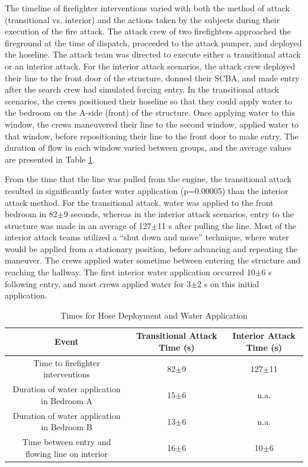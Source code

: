 \documentclass[12pt,oneside]{article}
\begin{document}
The timeline of firefighter interventions varied with both the method of attack (transitional vs. interior) and the actions taken by the subjects during their execution of the fire attack. The attack crew of two firefighters approached the fireground at the time of dispatch, proceeded to the attack pumper, and deployed the hoseline. The attack team was directed to execute either a transitional attack or an interior attack. For the interior attack scenarios, the attack crew deployed their line to the front door of the structure, donned their SCBA, and made entry after the search crew had simulated forcing entry. In  the transitional attack scenarios, the crews positioned their hoseline so that they could apply water to the bedroom on the A-side (front) of the structure. Once applying water to this window, the crews maneuvered their line to the second window, applied water to that window, before repositioning their line to the front door to make entry. The duration of flow in each window varied between groups, and the average values are presented in Table \ref{tab:suppression_times}. 

From the time that the line was pulled from the engine, the transitional attack resulted in significantly faster water application (p=0.00005) than the interior attack method. For the transitional attack, water was applied to the front bedroom in 82$\pm$9 seconds, whereas in the interior attack scenarios, entry to the structure was made in an average of 127$\pm$11 s after pulling the line. Most of the interior attack teams utilized a ``shut down and move'' technique, where water would be applied from a stationary position, before advancing and repeating the maneuver. The crews applied water sometime between entering the structure and reaching the hallway. The first interior water application occurred 10$\pm$6 s following entry, and most crews applied water for 3$\pm$2 s on this initial application. 

\begin{table}[!ht]
    \centering
    \caption{Times for Hose Deployment and Water Application}
    \label{tab:suppression_times}
    \begin{tabular}{ccc}
    \toprule[1.5pt]
 	 Event 											&	Transitional Attack Time (s)	&	Interior Attack Time (s)\\
 	\midrule 
 	Time to firefighter interventions				& 82$\pm$9							& 127$\pm$11				\\
 	Duration of water application in Bedroom A 		& 15$\pm$6							& n.a.							\\
 	Duration of water application in Bedroom B 		& 13$\pm$6							& n.a.							\\
 	Time between entry and flowing line on interior & 16$\pm$6							& 10$\pm$6  						\\
 	\bottomrule[1.25pt] 
    \end{tabular}
\end{table}
\end{document}
